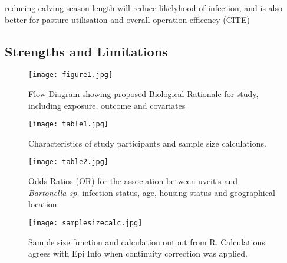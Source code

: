 \documentclass[12pt]{article}
\begin{document}
		reducing calving season length will reduce likelyhood of infection, and is also better for pasture utilisation and overall operation efficency (CITE)	

	\subsection{Strengths and Limitations}

\begin{figure*}[h!]
	\centering
	\texttt{[image: figure1.jpg]}
	\caption{Flow Diagram showing proposed Biological Rationale for study, including exposure, outcome and covariates }
	\label{fig:1}
\end{figure*}

\begin{figure*}[h!]
	\centering
	\texttt{[image: table1.jpg]}
	\caption{Characteristics of study participants and sample size calculations.}
	\label{tab:1}
\end{figure*}
 
\begin{figure*}[h!]
	\centering
	\texttt{[image: table2.jpg]}
	\caption{Odds Ratios (OR) for the association between uveitis and \emph{Bartonella sp.} infection status, age, housing status and geographical location.}
	\label{tab:2}
\end{figure*}

\begin{figure*}[h!]
	\centering
	\texttt{[image: samplesizecalc.jpg]}
	\caption{Sample size function and calculation output from R. Calculations agrees with Epi Info when continuity correction was applied.}
	\label{fig:samplesizecalc}
\end{figure*}

\clearpage


\end{document}
